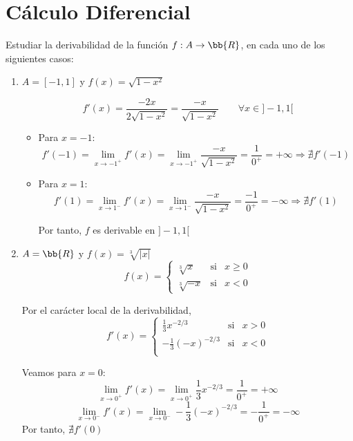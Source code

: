 \section{Cálculo Diferencial}

\begin{ejercicio}\label{Ejercicio:1}
Estudiar la derivabilidad de la función $f:A\to \bb{R}$, en cada uno de los siguientes casos:
\begin{enumerate}
    \item $A=[-1,1]$ y $f(x)=\sqrt{1-x^2}$
    
    $$f'(x)=\frac{-2x}{2\sqrt{1-x^2}} = \frac{-x}{\sqrt{1-x^2}} \qquad \forall x \in ]-1, 1[$$
    \begin{itemize}
        \item Para $x=-1$:
        \begin{equation*}
            f'(-1)=\lim_{x\to -1^+} f'(x) = \lim_{x\to -1^+} \frac{-x}{\sqrt{1-x^2}} = \frac{1}{0^+} = +\infty \Longrightarrow \nexists f'(-1)
        \end{equation*}

        \item Para $x=1$:
        \begin{equation*}
            f'(1)=\lim_{x\to 1^-} f'(x) = \lim_{x\to 1^-} \frac{-x}{\sqrt{1-x^2}} = \frac{-1}{0^+} = -\infty \Longrightarrow \nexists f'(1)
        \end{equation*}

        Por tanto, $f$ es derivable en $]-1,1[$
    \end{itemize}

    \item $A=\bb{R}$ y $f(x)=\sqrt[3]{|x|}$
    $$f(x)=\left\{
    \begin{array}{ccc}
    \displaystyle \sqrt[3]{x} & \text{si} & x\geq 0 \\
    \displaystyle \sqrt[3]{-x} & \text{si} & x<0
    \end{array}\right.$$

    Por el carácter local de la derivabilidad,
    $$f'(x)=\left\{
    \begin{array}{ccc}
    \frac{1}{3}x^{-2/3} & \text{si} & x > 0 \\
    -\frac{1}{3}(-x)^{-2/3} & \text{si} & x < 0 \\
    \end{array}\right.$$

    Veamos para $x=0$:
    \begin{equation*}
        \lim_{x\to 0^+} f'(x) = \lim_{x\to 0^+} \frac{1}{3}x^{-2/3} = \frac{1}{0^+} = +\infty
    \end{equation*}
    \begin{equation*}
        \lim_{x\to 0^-} f'(x) = \lim_{x\to 0^-} -\frac{1}{3}(-x)^{-2/3} = -\frac{1}{0^+} = -\infty
    \end{equation*}
    Por tanto, $\nexists f'(0)$    


\end{enumerate}
\end{ejercicio}
